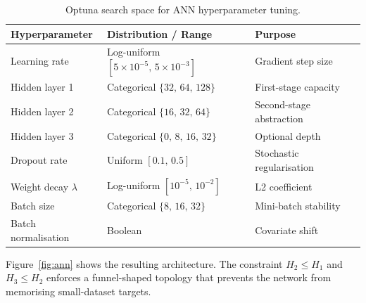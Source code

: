 \documentclass[11pt,a4paper]{article}
\begin{document}
\begin{table}[!htbp]
\centering
\caption{Optuna search space for ANN hyperparameter tuning.}
\label{tab:optuna}
\renewcommand{\arraystretch}{1.15}
\begin{tabular}{@{}lll@{}}
\toprule
\textbf{Hyperparameter} & \textbf{Distribution / Range} & \textbf{Purpose} \\
\midrule
Learning rate & Log-uniform $[5\times10^{-5},\,5\times10^{-3}]$ & Gradient step size \\
Hidden layer 1 & Categorical $\{32,\,64,\,128\}$ & First-stage capacity \\
Hidden layer 2 & Categorical $\{16,\,32,\,64\}$ & Second-stage abstraction \\
Hidden layer 3 & Categorical $\{0,\,8,\,16,\,32\}$ & Optional depth \\
Dropout rate & Uniform $[0.1,\,0.5]$ & Stochastic regularisation \\
Weight decay $\lambda$ & Log-uniform $[10^{-5},\,10^{-2}]$ & L2 coefficient \\
Batch size & Categorical $\{8,\,16,\,32\}$ & Mini-batch stability \\
Batch normalisation & Boolean & Covariate shift \\
\bottomrule
\end{tabular}
\end{table}

Figure~\ref{fig:ann} shows the resulting architecture. The constraint
$H_2 \le H_1$ and $H_3 \le H_2$ enforces a funnel-shaped topology that
prevents the network from memorising small-dataset targets.
\end{document}
